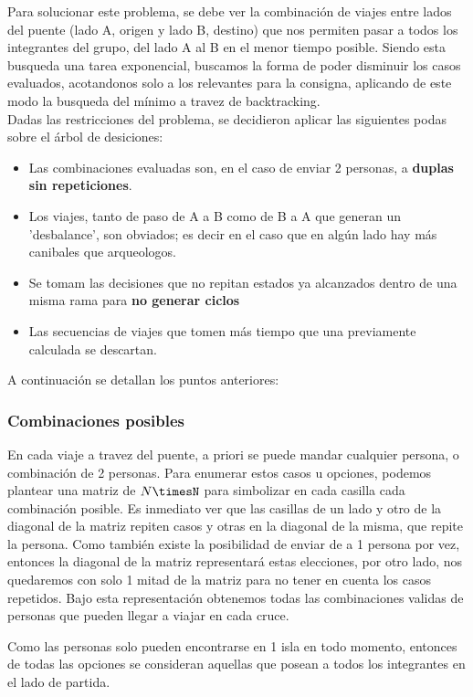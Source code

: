 Para solucionar este problema, se debe ver la combinaci\'on de viajes entre lados del puente (lado A, origen y lado B, destino) que nos permiten pasar a todos los integrantes
del grupo, del lado A al B en el menor tiempo posible. Siendo esta busqueda una tarea exponencial, buscamos la forma de poder disminuir los casos evaluados, acotandonos solo a los relevantes
para la consigna, aplicando de este modo la busqueda del m\'inimo a travez de backtracking.\\

Dadas las restricciones del problema, se decidieron aplicar las siguientes podas sobre el árbol de desiciones:
\begin{itemize}
	\item Las combinaciones evaluadas son, en el caso de enviar 2 personas, a {\bf duplas sin repeticiones}.
	\item Los viajes, tanto de paso de A a B como de B a A que generan un 'desbalance', son obviados; es decir en el caso que en alg\'un lado hay más canibales que arqueologos.
	
	\item Se tomam las decisiones que no repitan estados ya alcanzados dentro de una misma rama para {\bf no generar  ciclos}
	\item Las secuencias de viajes que tomen más tiempo que una previamente calculada se descartan.
\end{itemize}

A continuación se detallan los puntos anteriores:


\subsubsection*{Combinaciones posibles}
En cada viaje a travez del puente, a priori se puede mandar cualquier persona, o combinación de 2 personas. Para enumerar estos casos u opciones, podemos plantear una matriz de $N\timesN$ para simbolizar en cada casilla cada combinación posible. Es inmediato ver que las casillas de un lado y otro de la diagonal de la matriz repiten casos y otras en la diagonal de la misma, que repite la persona. Como también existe la posibilidad de enviar de a 1 persona por vez, entonces la diagonal de la matriz representará estas elecciones, por otro lado, nos quedaremos con solo 1 mitad de la matriz para no tener en cuenta los casos repetidos. Bajo esta representación obtenemos todas las combinaciones validas de personas que pueden llegar a viajar en cada cruce.

Como las personas solo pueden encontrarse en 1 isla en todo momento, entonces de todas las opciones se consideran aquellas que posean a todos los integrantes en el lado de partida.

